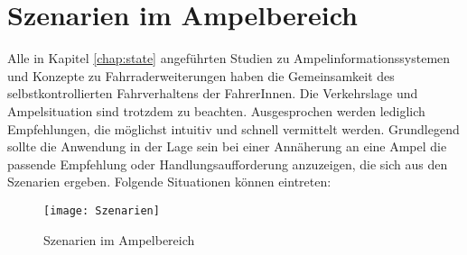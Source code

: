 \chapter{\label{chap:szenarien}Szenarien im Ampelbereich}
Alle in Kapitel \ref{chap:state} angeführten Studien zu Ampelinformationssystemen und Konzepte zu Fahrraderweiterungen haben die Gemeinsamkeit des selbstkontrollierten Fahrverhaltens der FahrerInnen. Die Verkehrslage und Ampelsituation sind trotzdem zu beachten. Ausgesprochen werden lediglich Empfehlungen, die möglichst intuitiv und schnell vermittelt werden. Grundlegend sollte die Anwendung in der Lage sein bei einer Annäherung an eine Ampel die passende Empfehlung oder Handlungsaufforderung anzuzeigen, die sich aus den Szenarien ergeben. Folgende Situationen können eintreten:\\
\begin{figure}[H]  
    \centering  
    \texttt{[image: Szenarien]} 
    \grayRule
    \caption[Szenarien]{Szenarien im Ampelbereich}
    \label{fig:szenarien}
\end{figure} \vspace{17pt}
